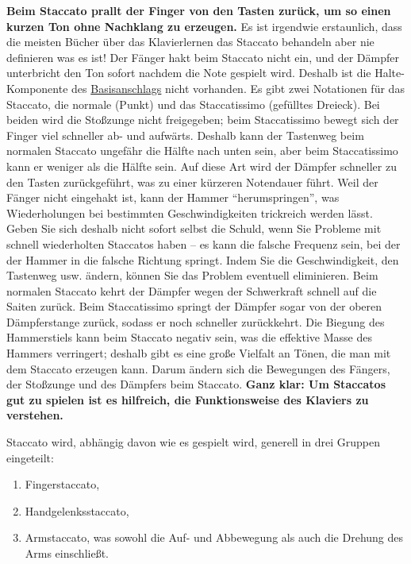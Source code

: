 \textbf{Beim Staccato prallt der Finger von den Tasten zurück, um so einen kurzen Ton ohne Nachklang zu erzeugen.}
Es ist irgendwie erstaunlich, dass die meisten Bücher über das Klavierlernen das Staccato behandeln aber nie definieren was es ist!
Der Fänger hakt beim Staccato nicht ein, und der Dämpfer unterbricht den Ton sofort nachdem die Note gespielt wird.
Deshalb ist die Halte-Komponente des \hyperref[c1iii1a1]{Basisanschlags} nicht vorhanden.
Es gibt zwei Notationen für das Staccato, die normale (Punkt) und das Staccatissimo (gefülltes Dreieck).
Bei beiden wird die Stoßzunge nicht freigegeben; beim Staccatissimo bewegt sich der Finger viel schneller ab- und aufwärts.
Deshalb kann der Tastenweg beim normalen Staccato ungefähr die Hälfte nach unten sein, aber beim Staccatissimo kann er weniger als die Hälfte sein.
Auf diese Art wird der Dämpfer schneller zu den Tasten zurückgeführt, was zu einer kürzeren Notendauer führt.
Weil der Fänger nicht eingehakt ist, kann der Hammer \enquote{herumspringen}, was Wiederholungen bei bestimmten Geschwindigkeiten trickreich werden lässt.
Geben Sie sich deshalb nicht sofort selbst die Schuld, wenn Sie Probleme mit schnell wiederholten Staccatos haben -- es kann die falsche Frequenz sein, bei der der Hammer in die falsche Richtung springt.
Indem Sie die Geschwindigkeit, den Tastenweg usw. ändern, können Sie das Problem eventuell eliminieren.
Beim normalen Staccato kehrt der Dämpfer wegen der Schwerkraft schnell auf die Saiten zurück.
Beim Staccatissimo springt der Dämpfer sogar von der oberen Dämpferstange zurück, sodass er noch schneller zurückkehrt.
Die Biegung des Hammerstiels kann beim Staccato negativ sein, was die effektive Masse des Hammers verringert;
deshalb gibt es eine große Vielfalt an Tönen, die man mit dem Staccato erzeugen kann.
Darum ändern sich die Bewegungen des Fängers, der Stoßzunge und des Dämpfers beim Staccato.
\textbf{Ganz klar: Um Staccatos gut zu spielen ist es hilfreich, die Funktionsweise des Klaviers zu verstehen.}

Staccato wird, abhängig davon wie es gespielt wird, generell in drei Gruppen eingeteilt:

\begin{enumerate}[label={\roman*.}] 
\item Fingerstaccato,
\item Handgelenksstaccato,
\item Armstaccato, was sowohl die Auf- und Abbewegung als auch die Drehung des Arms einschließt.
\end{enumerate}


